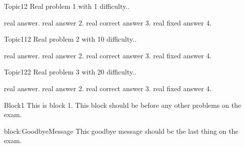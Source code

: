 \documentclass[master]{exam}
\begin{document}
    \begin{problem}[requires=Block1]{Topic1}{2}
        Real problem 1  with 1 difficulty..
        \begin{answers}
	        \answer real answer.
	        \answer real answer 2.
	        \answer[correct] real correct answer 3.
	        \answer[fixed] real fixed answer 4.
        \end{answers}
    \end{problem}
    
    \begin{problem}[requires=Block1]{Topic1}{12}
        Real problem 2  with 10 difficulty..
        \begin{answers}
	        \answer real answer.
	        \answer real answer 2.
	        \answer[correct] real correct answer 3.
	        \answer[fixed] real fixed answer 4.
        \end{answers}
    \end{problem}
    
     \begin{problem}[requires=Block1]{Topic1}{22}
        Real problem 3  with 20 difficulty..
        \begin{answers}
	        \answer real answer.
	        \answer real answer 2.
	        \answer[correct] real correct answer 3.
	        \answer[fixed] real fixed answer 4.
        \end{answers}
    \end{problem}
    
    \begin{block}{Block1}
        This is block 1. This block should be before any other problems on the exam.
    \end{block}
    
     \begin{block}{block:GoodbyeMessage}
        This goodbye message should be the last thing on the exam.
    \end{block}
\end{document}
